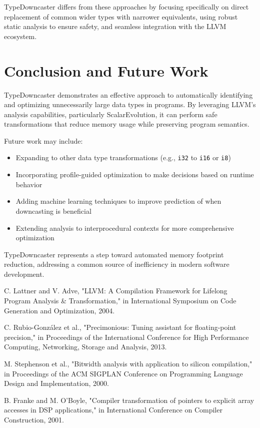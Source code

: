 \documentclass[conference]{IEEEtran}
\begin{document}
TypeDowncaster differs from these approaches by focusing specifically on direct replacement of common wider types with narrower equivalents, using robust static analysis to ensure safety, and seamless integration with the LLVM ecosystem.

\section{Conclusion and Future Work}
TypeDowncaster demonstrates an effective approach to automatically identifying and optimizing unnecessarily large data types in programs. By leveraging LLVM's analysis capabilities, particularly ScalarEvolution, it can perform safe transformations that reduce memory usage while preserving program semantics.

Future work may include:
\begin{itemize}
    \item Expanding to other data type transformations (e.g., \texttt{i32} to \texttt{i16} or \texttt{i8})
    \item Incorporating profile-guided optimization to make decisions based on runtime behavior
    \item Adding machine learning techniques to improve prediction of when downcasting is beneficial
    \item Extending analysis to interprocedural contexts for more comprehensive optimization
\end{itemize}

TypeDowncaster represents a step toward automated memory footprint reduction, addressing a common source of inefficiency in modern software development.

\begin{thebibliography}{00}
 C. Lattner and V. Adve, "LLVM: A Compilation Framework for Lifelong Program Analysis \& Transformation," in International Symposium on Code Generation and Optimization, 2004.

 C. Rubio-González et al., "Precimonious: Tuning assistant for floating-point precision," in Proceedings of the International Conference for High Performance Computing, Networking, Storage and Analysis, 2013.

 M. Stephenson et al., "Bitwidth analysis with application to silicon compilation," in Proceedings of the ACM SIGPLAN Conference on Programming Language Design and Implementation, 2000.

 B. Franke and M. O'Boyle, "Compiler transformation of pointers to explicit array accesses in DSP applications," in International Conference on Compiler Construction, 2001.
\end{thebibliography}
\end{document}
